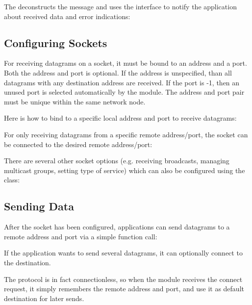 The  deconstructs the message and uses the
 interface to notify the application about
received data and error indications:


\subsection*{Configuring Sockets}

For receiving  datagrams on a socket, it must be bound to an
address and a port. Both the address and port is optional. If the address is
unspecified, than all  datagrams with any destination address are
received. If the port is -1, then an unused port is selected automatically by
the  module. The address and port pair must be unique within the
same network node.

Here is how to bind to a specific local address and port to receive
 datagrams:


For only receiving  datagrams from a specific remote address/port,
the socket can be connected to the desired remote address/port:


There are several other socket options (e.g. receiving broadcasts, managing
multicast groups, setting type of service) which can also be configured using
the  class:


\subsection*{Sending Data}

After the socket has been configured, applications can send datagrams to a
remote address and port via a simple function call:


If the application wants to send several datagrams, it can optionally connect to
the destination.

The  protocol is in fact connectionless, so when the 
module receives the connect request, it simply remembers the remote address and
port, and use it as default destination for later sends.

